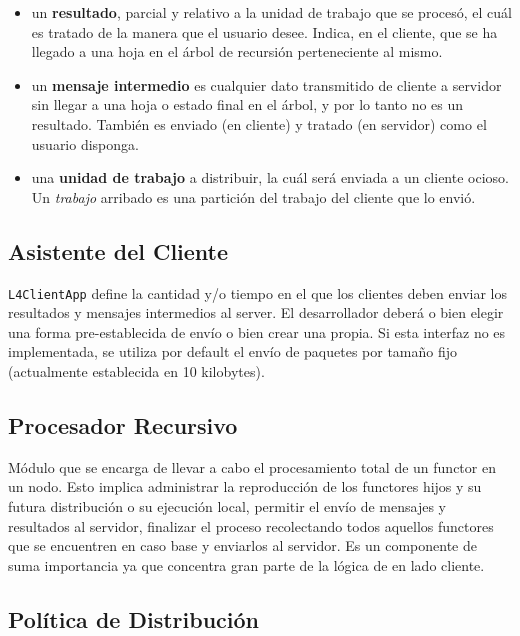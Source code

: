 \begin{itemize}
    \item   un \textbf{resultado}, parcial y relativo a la unidad de trabajo que se procesó, el cuál es tratado de la
        manera que el usuario desee. Indica, en el cliente, que se ha llegado a una hoja en el árbol de recursión
        perteneciente al mismo.
    \item   un \textbf{mensaje intermedio} es cualquier dato transmitido de cliente a servidor sin llegar a una hoja o
        estado final en el árbol, y por lo tanto no es un resultado. También es enviado (en cliente) y tratado (en
        servidor) como el usuario disponga.
    \item   una \textbf{unidad de trabajo} a distribuir, la cuál será enviada a un cliente ocioso. Un \textit{trabajo}
        arribado es una partición del trabajo del cliente que lo envió.
\end{itemize}

\subsection{Asistente del Cliente}
\label{client_helper}

\texttt{L4ClientApp} define la cantidad y/o tiempo en el que los clientes deben enviar los resultados y mensajes intermedios al server. El
desarrollador deberá o bien elegir una forma pre-establecida de envío o bien crear una propia. Si esta interfaz no es implementada, se
utiliza por default el envío de paquetes por tamaño fijo (actualmente establecida en 10 kilobytes).

\subsection{Procesador Recursivo}
\label{RProcessor}
Módulo que se encarga de llevar a cabo el procesamiento total de un functor en un nodo. Esto implica administrar la
reproducción de los functores hijos y su futura distribución o su ejecución local, permitir el envío de mensajes
y resultados al servidor, finalizar el proceso recolectando todos aquellos functores que se encuentren en caso base y
enviarlos al servidor. Es un componente de suma importancia ya que concentra gran parte de la lógica de \rc{} en lado
cliente.

\subsection{Política de Distribución}
\label{distribution_policy}

